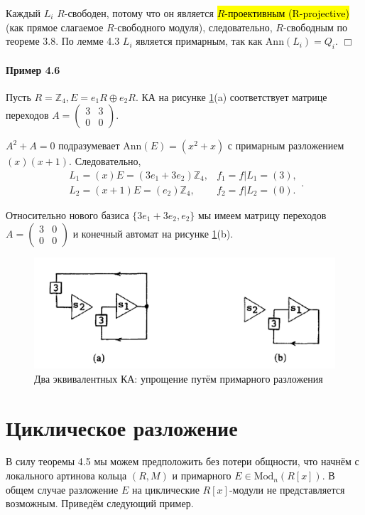 \documentclass[a4paper,12pt]{article}
\newcommand{\Ann}{\text{Ann}}
\newcommand{\Mod}{\text{Mod}}
\begin{document}
Каждый $L_i$ $R$-свободен, потому что он является \hl{$R$-проективным (R-projective)} (как прямое слагаемое $R$-свободного модуля), следовательно, $R$-свободным по теореме 3.8. По лемме 4.3 $L_i$ является примарным, так как $\Ann(L_i) = Q_i$. $\Box$

\paragraph{Пример 4.6}
Пусть $R = \mathbb{Z}_4, E = e_1 R \oplus e_2 R$. КА на рисунке \ref{fig3ab}(a) соответствует матрице переходов
$ A =
\begin{pmatrix}
	3 & 3\\
	0 & 0
\end{pmatrix}
$.

$A^2 + A = 0$ подразумевает $\Ann(E) = (x^2 + x)$ с  примарным разложением $(x)(x + 1)$. Следовательно,
$$
\begin{array}{cc}
L_1 = (x)E = (3 e_1 + 3 e_2) \mathbb{Z}_4, & f_1 = f | L_1 = (3), \\
L_2 = (x+1)E = (e_2) \mathbb{Z}_4, & f_2 = f|L_2 = (0).
\end{array}.
$$

Относительно нового базиса $\{3 e_1 + 3 e_2, e_2\}$ мы имеем матрицу переходов ${ A =
\begin{pmatrix}
	3 & 0\\
	0 & 0
\end{pmatrix}}
$ и конечный автомат на рисунке \ref{fig3ab}(b).

\begin{figure}[h]
	\centering
	\includegraphics[width=0.7\linewidth]{pictures/fig3ab.png}
	\caption{Два эквивалентных КА: упрощение путём примарного разложения}
	\label{fig3ab}
\end{figure}

\section{Циклическое разложение}
В силу теоремы 4.5 мы можем предположить без потери общности, что начнём с локального артинова кольца $(R,M)$ и примарного $E \in \Mod_n(R[x])$. В общем случае разложение $E$ на циклические $R[x]$-модули не представляется возможным. Приведём следующий пример.
\end{document}
